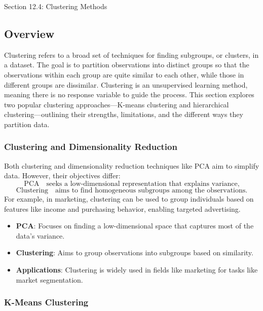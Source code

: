 \begin{notes}{Section 12.4: Clustering Methods}
    \subsection*{Overview}

    Clustering refers to a broad set of techniques for finding subgroups, or clusters, in a dataset. The goal is to partition observations into distinct groups so that the observations within each group 
    are quite similar to each other, while those in different groups are dissimilar. Clustering is an unsupervised learning method, meaning there is no response variable to guide the process. This section 
    explores two popular clustering approaches—K-means clustering and hierarchical clustering—outlining their strengths, limitations, and the different ways they partition data.
    
    \subsubsection*{Clustering and Dimensionality Reduction}
    
    Both clustering and dimensionality reduction techniques like PCA aim to simplify data. However, their objectives differ:
    \[
    \text{PCA} \quad \text{seeks a low-dimensional representation that explains variance,}
    \]
    \[
    \text{Clustering} \quad \text{aims to find homogeneous subgroups among the observations.}
    \]
    For example, in marketing, clustering can be used to group individuals based on features like income and purchasing behavior, enabling targeted advertising.
    
    \begin{highlight}
        \begin{itemize}
            \item \textbf{PCA}: Focuses on finding a low-dimensional space that captures most of the data’s variance.
            \item \textbf{Clustering}: Aims to group observations into subgroups based on similarity.
            \item \textbf{Applications}: Clustering is widely used in fields like marketing for tasks like market segmentation.
        \end{itemize}
    \end{highlight}
    
    \subsubsection*{K-Means Clustering}
    

\end{notes}
